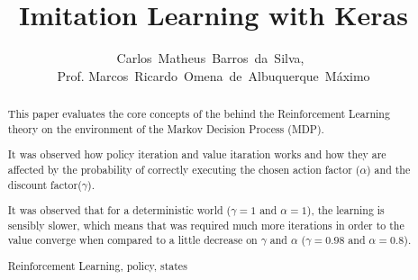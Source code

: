 \documentclass[journal]{IEEEtran}
\begin{document}
    \title{Imitation Learning with Keras}
  \author{Carlos~Matheus~Barros~da~Silva,~
  \\Prof. Marcos~Ricardo~Omena~de~Albuquerque~Máximo}


\maketitle



\begin{abstract}

This paper evaluates the core concepts of the behind the Reinforcement Learning
theory on the environment of the Markov Decision Process (MDP).

It was observed how policy iteration and value itaration works and how they are
affected by the probability of correctly executing the chosen action factor
($\alpha$) and the discount factor($\gamma$).

It was observed that for a deterministic world ($\gamma = 1$ and $\alpha = 1$),
the learning is sensibly slower, which means that was required much more iterations
in order to the value converge when compared to a little decrease on $\gamma$ and
$\alpha$ ($\gamma = 0.98$ and $\alpha = 0.8$).

\begin{IEEEkeywords}
    Reinforcement Learning, policy, states
\end{IEEEkeywords}
\end{abstract}

\IEEEpeerreviewmaketitle


\end{document}
